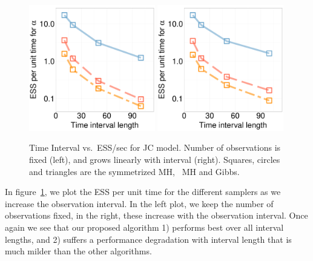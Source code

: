   \begin{figure}%
  \centering
  \begin{minipage}[!hp]{0.58\linewidth}
  \centering
    \includegraphics [width=0.49\textwidth, angle=0]{figs/new_experiment_figs/ESS_vs_t_alpha_JC.pdf}
    \includegraphics [width=0.49\textwidth, angle=0]{figs/new_experiment_figs/ESS_vs_t_alpha_fixobservation_JC.pdf}
  \end{minipage}
  \begin{minipage}[!hp]{0.01\linewidth}
  \end{minipage}
  \begin{minipage}[!hp]{0.4\linewidth}
    \caption{Time Interval vs.\ ESS/sec for JC model. Number of observations is fixed (left), and grows linearly with interval (right). Squares, circles and triangles are the symmetrized MH, \naive\ MH and Gibbs. }
	\label{fig:jc_model_vs_t}
  \end{minipage}
  \end{figure}


In figure~\ref{fig:jc_model_vs_t}, we plot the ESS per unit time for the
different samplers as we increase the observation interval. In the left plot,
we keep the number of observations fixed, in the right, these increase with
the observation interval. Once again we see that our proposed algorithm
1) performs best over all interval lengths, and 2) suffers a performance
degradation with interval length that is much milder than the other algorithms.

